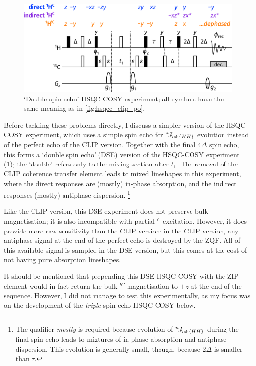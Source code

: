 \documentclass[a4paper,12pt]{article}
\newcommand{\magn}[1]{\ch{^1H}$^{#1}$}
\newcommand{\magnnot}[1]{\ch{^1H}$^{!#1}$}
\newcommand{\nJ}[1]{{}^{n}\!J_{\!\ch{#1}}}
\begin{document}
\begin{refsection}
\begin{figure}[!ht]
    \centering
    \includegraphics[]{dse_po.png}%
    \caption[Double spin echo HSQC-COSY experiment]{
        `Double spin echo' HSQC-COSY experiment; all symbols have the same meaning as in \cref{fig:hsqcc_clip_po}.
    }
    \label{fig:hsqcc_dse_po}
\end{figure}

Before tackling these problems directly, I discuss a simpler version of the HSQC-COSY experiment, which uses a simple spin echo for $\nJ{HH}$ evolution instead of the perfect echo of the CLIP version.
Together with the final $4\Delta$ spin echo, this forms a `double spin echo' (DSE) version of the HSQC-COSY experiment (\cref{fig:hsqcc_dse_po}); the `double' refers only to the mixing section after $t_1$.
The removal of the CLIP coherence transfer element leads to mixed lineshapes in this experiment, where the direct responses are (mostly) in-phase absorption, and the indirect responses (mostly) antiphase dispersion.%
\footnote{The qualifier \textit{mostly} is required because evolution of $\nJ{HH}$ during the final spin echo leads to mixtures of in-phase absorption and antiphase dispersion. This evolution is generally small, though, because $2\Delta$ is smaller than $\tau$.}

Like the CLIP version, this DSE experiment does not preserve bulk magnetisation; it is also incompatible with partial \magn{C} excitation.
However, it does provide more raw sensitivity than the CLIP version: in the CLIP version, any antiphase signal at the end of the perfect echo is destroyed by the ZQF.
All of this available signal is sampled in the DSE version, but this comes at the cost of not having pure absorption lineshapes.

It should be mentioned that prepending this DSE HSQC-COSY with the ZIP element would in fact return the bulk \magnnot{C} magnetisation to $+z$ at the end of the sequence.
However, I did not manage to test this experimentally, as my focus was on the development of the \textit{triple} spin echo HSQC-COSY below.



\end{refsection}
\end{document}
